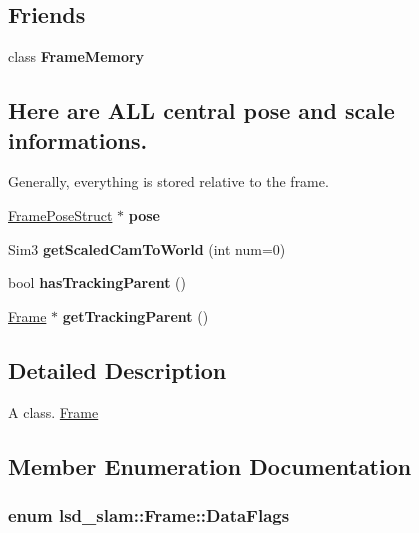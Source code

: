 \subsection*{Friends}
\begin{DoxyCompactItemize}
\item 
\hypertarget{classlsd__slam_1_1_frame_a301c44f1a60e7b77092f38610c22f920}{class {\bfseries Frame\-Memory}}\label{classlsd__slam_1_1_frame_a301c44f1a60e7b77092f38610c22f920}

\end{DoxyCompactItemize}
\subsection*{Here are A\-L\-L central pose and scale informations.}
\label{_amgrp5f1d35ac154a4abbd9f78aa423255c4e}%
Generally, everything is stored relative to the frame. \begin{DoxyCompactItemize}
\item 
\hypertarget{classlsd__slam_1_1_frame_a9e446e7abf6fc1e988594935dad9072b}{\hyperlink{classlsd__slam_1_1_frame_pose_struct}{Frame\-Pose\-Struct} $\ast$ {\bfseries pose}}\label{classlsd__slam_1_1_frame_a9e446e7abf6fc1e988594935dad9072b}

\item 
\hypertarget{classlsd__slam_1_1_frame_a0f4a92d51569c280e4b37acbf562ea47}{Sim3 {\bfseries get\-Scaled\-Cam\-To\-World} (int num=0)}\label{classlsd__slam_1_1_frame_a0f4a92d51569c280e4b37acbf562ea47}

\item 
\hypertarget{classlsd__slam_1_1_frame_a013921be6869702deac98090a8c9033c}{bool {\bfseries has\-Tracking\-Parent} ()}\label{classlsd__slam_1_1_frame_a013921be6869702deac98090a8c9033c}

\item 
\hypertarget{classlsd__slam_1_1_frame_ae337afb7e308ff6d9be3ffa354fc66d6}{\hyperlink{classlsd__slam_1_1_frame}{Frame} $\ast$ {\bfseries get\-Tracking\-Parent} ()}\label{classlsd__slam_1_1_frame_ae337afb7e308ff6d9be3ffa354fc66d6}

\end{DoxyCompactItemize}


\subsection{Detailed Description}
A class. \hyperlink{classlsd__slam_1_1_frame}{Frame} 

\subsection{Member Enumeration Documentation}
\hypertarget{classlsd__slam_1_1_frame_a91c2bcdbabb5db67344b5379588e6990}{
\subsubsection[{Data\-Flags}]{\setlength{\rightskip}{0pt plus 5cm}enum {\bf lsd\-\_\-slam\-::\-Frame\-::\-Data\-Flags}}}\label{classlsd__slam_1_1_frame_a91c2bcdbabb5db67344b5379588e6990}



